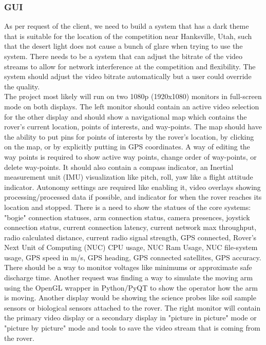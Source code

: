 \documentclass[onecolumn, draftclsnofoot, 10pt, compsoc]{IEEEtran}
\begin{document}
\subsubsection{GUI}
As per request of the client, we need to build a system that has a dark theme that is suitable for the location of the competition near Hanksville, Utah, such that the desert light does not cause a bunch of glare when trying to use the system. There needs to be a system that can adjust the bitrate of the video streams to allow for network interference at the competition and flexibility. The system should adjust the video bitrate automatically but a user could override the quality. 
\\
\noindent The project most likely will run on two 1080p (1920x1080) monitors in full-screen mode on both displays. The left monitor should contain an active video selection for the other display and should show a navigational map which contains the rover's current location, points of interests, and way-points. The map should have the ability to put pins for points of interests by the rover's location, by clicking on the map, or by explicitly putting in GPS coordinates. A way of editing the way points is required to show active way points, change order of way-points, or delete way-points. It should also contain a compass indicator, an Inertial measurement unit (IMU) visualization like pitch, roll, yaw like a flight attitude indicator. Autonomy settings are required like enabling it, video overlays showing processing/processed data if possible, and indicator for when the rover reaches its location and stopped. There is a need to show the statues of the core systems: "bogie" connection statuses, arm connection status, camera presences, joystick connection status, current connection latency, current network max throughput, radio calculated distance, current radio signal strength, GPS connected, Rover's Next Unit of Computing (NUC) CPU usage, NUC Ram Usage, NUC file-system usage, GPS speed in m/s, GPS heading, GPS connected satellites, GPS accuracy. There should be a way to monitor voltages like minimums or approximate safe discharge time. Another request was finding a way to simulate the moving arm using the OpenGL wrapper in Python/PyQT to show the operator how the arm is moving. Another display would be showing the science probes like soil sample sensors or biological sensors attached to the rover. The right monitor will contain the primary video display or a secondary display in "picture in picture" mode or "picture by picture" mode and tools to save the video stream that is coming from the rover.
\end{document}
